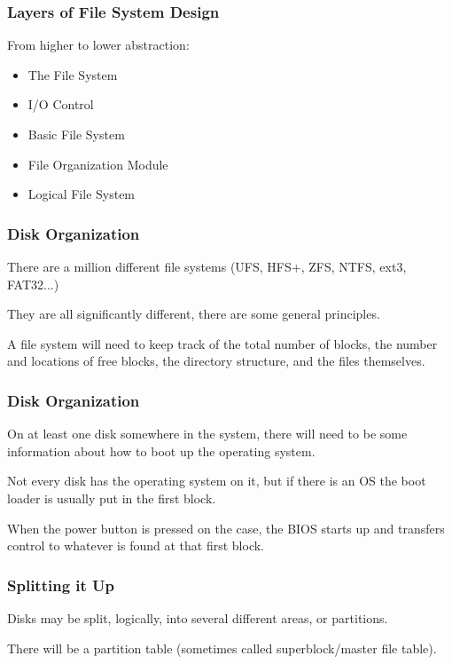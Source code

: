 \begin{frame}
\frametitle{Layers of File System Design}

From higher to lower abstraction:

\begin{itemize}
	\item The File System
	\item I/O Control
	\item Basic File System
	\item File Organization Module
	\item Logical File System
\end{itemize}

\end{frame}

\begin{frame}
\frametitle{Disk Organization}

There are a million different file systems (UFS, HFS+, ZFS, NTFS, ext3, FAT32...) 

They are all significantly different, there are some general principles. 

A file system will need to keep track of the total number of blocks, the number and locations of free blocks, the directory structure, and the files themselves.

\end{frame}

\begin{frame}
\frametitle{Disk Organization}

On at least one disk somewhere in the system, there will need to be some information about how to boot up the operating system. 

Not every disk has the operating system on it, but if there is an OS the boot loader is usually put in the first block. 

When the power button is pressed on the case, the BIOS starts up and transfers control to whatever is found at that first block.

\end{frame}

\begin{frame}
\frametitle{Splitting it Up}
Disks may be split, logically, into several different areas, or \alert{partitions}. 

There will be a partition table (sometimes called superblock/master file table).

\end{frame}

